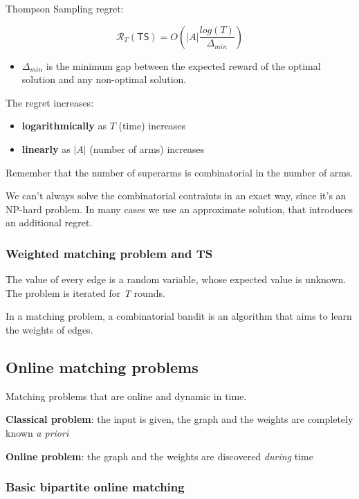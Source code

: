 \documentclass[10pt,a4paper]{article}
\begin{document}
Thompson Sampling regret:

$$\mathscr{R}_T (\mathsf{TS}) = O \left( |A| \frac{log(T)}{\Delta_{min}}\right)$$

\begin{itemize}

\item $\Delta_{min}$ is the minimum gap between the expected reward of the optimal solution and any non-optimal solution.
\end{itemize}

The regret increases:

\begin{itemize}
\item \textbf{logarithmically} as $T$ (time) increases
\item \textbf{linearly} as $|A|$ (number of arms) increases
\end{itemize}

Remember that the number of superarms is combinatorial in the number of arms.

We can't always solve the combinatorial contraints in an exact way, since it's an NP-hard problem. In many cases we use an approximate solution, that introduces an additional regret.

\subsubsection{Weighted matching problem and TS}\label{weighted-matching-problem-and-ts}

The value of every edge is a random variable, whose expected value is unknown. The problem is iterated for \textit{T} rounds.

In a matching problem, a combinatorial bandit is an algorithm that aims to learn the weights of edges.

\subsection{Online matching problems}\label{online-matching-problems}

Matching problems that are online and dynamic in time.

\textbf{Classical problem}: the input is given, the graph and the weights are completely known \textit{a priori}

\textbf{Online problem}: the graph and the weights are discovered \textit{during} time

\subsubsection{Basic bipartite online matching}\label{basic-bipartite-online-matching}
\end{document}
